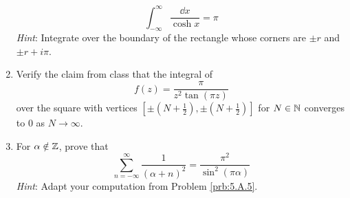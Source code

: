 \documentclass[../psets.tex]{subfiles}
\begin{document}
\begin{enumerate}[ref={A.\arabic*}]
    \begin{equation*}
        \int_{-\infty}^\infty\frac{\dd{x}}{\cosh x} = \pi
    \end{equation*}
    \emph{Hint}: Integrate over the boundary of the rectangle whose corners are $\pm r$ and $\pm r+i\pi$.
    \item \label{prb:5.A.5}Verify the claim from class that the integral of
    \begin{equation*}
        f(z) = \frac{\pi}{z^2\tan(\pi z)}
    \end{equation*}
    over the square with vertices $[\pm(N+\tfrac{1}{2}),\pm(N+\tfrac{1}{2})]$ for $N\in\mathbb{N}$ converges to 0 as $N\to\infty$.
    \item For $\alpha\notin\mathbb{Z}$, prove that
    \begin{equation*}
        \sum_{n=-\infty}^\infty\frac{1}{(\alpha+n)^2} = \frac{\pi^2}{\sin^2(\pi\alpha)}
    \end{equation*}
    \emph{Hint}: Adapt your computation from Problem \ref{prb:5.A.5}.
\end{enumerate}
\end{document}
